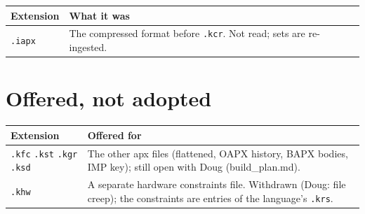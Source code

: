 {\small
\setlength{\tabcolsep}{6pt}
\begin{longtable}{>{\RaggedRight\arraybackslash}p{}>{\RaggedRight\arraybackslash}p{}}
\toprule
Extension & What it was \\
\midrule
\endhead
\texttt{.\allowbreak{}iapx} & The compressed format before \texttt{.\allowbreak{}kcr}. Not read; sets are re-ingested. \\
\bottomrule
\end{longtable}
}

\section{\texorpdfstring{Offered, not adopted}{Offered, not adopted}}

{\small
\setlength{\tabcolsep}{6pt}
\begin{longtable}{>{\RaggedRight\arraybackslash}p{}>{\RaggedRight\arraybackslash}p{}}
\toprule
Extension & Offered for \\
\midrule
\endhead
\texttt{.\allowbreak{}kfc} \texttt{.\allowbreak{}kst} \texttt{.\allowbreak{}kgr} \texttt{.\allowbreak{}ksd} & The other apx files (flattened, OAPX history, BAPX bodies, IMP key); still open with Doug (build\_\allowbreak{}plan.md). \\
\texttt{.\allowbreak{}khw} & A separate hardware constraints file. Withdrawn (Doug: file creep); the constraints are entries of the language's \texttt{.\allowbreak{}krs}. \\
\bottomrule
\end{longtable}
}
